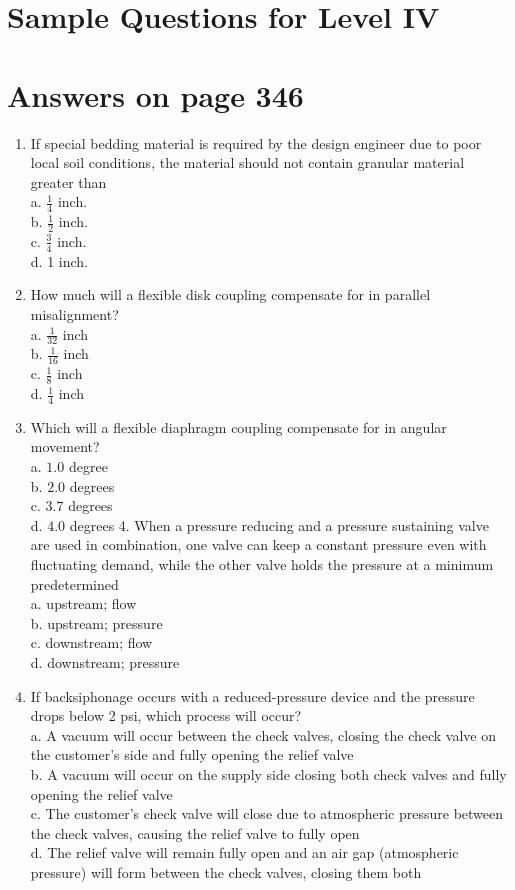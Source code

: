 \documentclass[10pt]{article}
\begin{document}
\section{Sample Questions for Level IV}
\section{Answers on page 346}
\begin{enumerate}
  \item If special bedding material is required by the design engineer due to poor local soil conditions, the material should not contain granular material greater than\\
a. $\frac{1}{4}$ inch.\\
b. $\frac{1}{2}$ inch.\\
c. $\frac{3}{4}$ inch.\\
d. 1 inch.

  \item How much will a flexible disk coupling compensate for in parallel misalignment?\\
a. $\frac{1}{32}$ inch\\
b. $\frac{1}{16}$ inch\\
c. $\frac{1}{8}$ inch\\
d. $\frac{1}{4}$ inch

  \item Which will a flexible diaphragm coupling compensate for in angular movement?\\
a. $1.0$ degree\\
b. $2.0$ degrees\\
c. $3.7$ degrees\\
d. $4.0$ degrees 4. When a pressure reducing and a pressure sustaining valve are used in combination, one valve can keep a constant pressure even with fluctuating demand, while the other valve holds the pressure at a minimum predetermined\\
a. upstream; flow\\
b. upstream; pressure\\
c. downstream; flow\\
d. downstream; pressure

  \item If backsiphonage occurs with a reduced-pressure device and the pressure drops below 2 psi, which process will occur?\\
a. A vacuum will occur between the check valves, closing the check valve on the customer's side and fully opening the relief valve\\
b. A vacuum will occur on the supply side closing both check valves and fully opening the relief valve\\
c. The customer's check valve will close due to atmospheric pressure between the check valves, causing the relief valve to fully open\\
d. The relief valve will remain fully open and an air gap (atmospheric pressure) will form between the check valves, closing them both

\end{enumerate}
\end{document}
